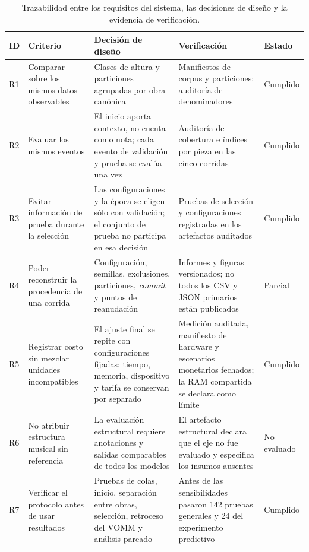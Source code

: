\begin{table}[p]
\centering
\caption{Trazabilidad entre los requisitos del sistema, las decisiones de diseño y la evidencia de verificación.}
\label{tab:chapter0-traceability}
\footnotesize
\setlength{\tabcolsep}{3pt}
\renewcommand{\arraystretch}{1.18}
\begin{tabular}{p{} p{} p{} p{} p{}}
\hline
ID & Criterio & Decisión de diseño & Verificación & Estado \\
\hline
R1 & Comparar sobre los mismos datos observables & Clases de altura y particiones agrupadas por obra canónica & Manifiestos de corpus y particiones; auditoría de denominadores & Cumplido \\
R2 & Evaluar los mismos eventos & El inicio aporta contexto, no cuenta como nota; cada evento de validación y prueba se evalúa una vez & Auditoría de cobertura e índices por pieza en las cinco corridas & Cumplido \\
R3 & Evitar información de prueba durante la selección & Las configuraciones y la época se eligen sólo con validación; el conjunto de prueba no participa en esa decisión & Pruebas de selección y configuraciones registradas en los artefactos auditados & Cumplido \\
R4 & Poder reconstruir la procedencia de una corrida & Configuración, semillas, exclusiones, particiones, \emph{commit} y puntos de reanudación & Informes y figuras versionados; no todos los CSV y JSON primarios están publicados & Parcial \\
R5 & Registrar costo sin mezclar unidades incompatibles & El ajuste final se repite con configuraciones fijadas; tiempo, memoria, dispositivo y tarifa se conservan por separado & Medición auditada, manifiesto de hardware y escenarios monetarios fechados; la RAM compartida se declara como límite & Cumplido \\
R6 & No atribuir estructura musical sin referencia & La evaluación estructural requiere anotaciones y salidas comparables de todos los modelos & El artefacto estructural declara que el eje no fue evaluado y especifica los insumos ausentes & No evaluado \\
R7 & Verificar el protocolo antes de usar resultados & Pruebas de colas, inicio, separación entre obras, selección, retroceso del VOMM y análisis pareado & Antes de las sensibilidades pasaron 142 pruebas generales y 24 del experimento predictivo & Cumplido \\
\hline
\end{tabular}
\end{table}
